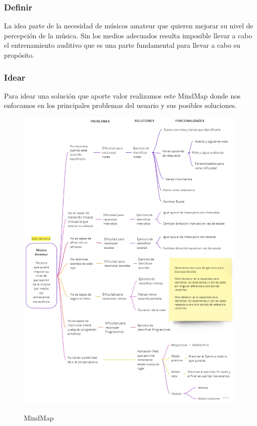 \documentclass[12pt,twoside,titlepage]{report}
\begin{document}
\subsubsection{Definir}

La idea parte de la necesidad de músicos amateur que quieren mejorar su nivel de percepción de la música. Sin los medios adecuados resulta imposible llevar a cabo el entrenamiento auditivo que es una parte fundamental para llevar a cabo su propósito. 

\subsubsection{Idear}

Para idear una solución que aporte valor realizamos este MindMap donde nos enfocamos en los principales problemas del usuario y sus posibles soluciones.

\begin{figure}[H]
    \centering
    \includegraphics[scale=0.47]{Design Thinking/MindMap}
    \label{fig:Mindmap}
    \caption{MindMap}
\end{figure}
\end{document}
